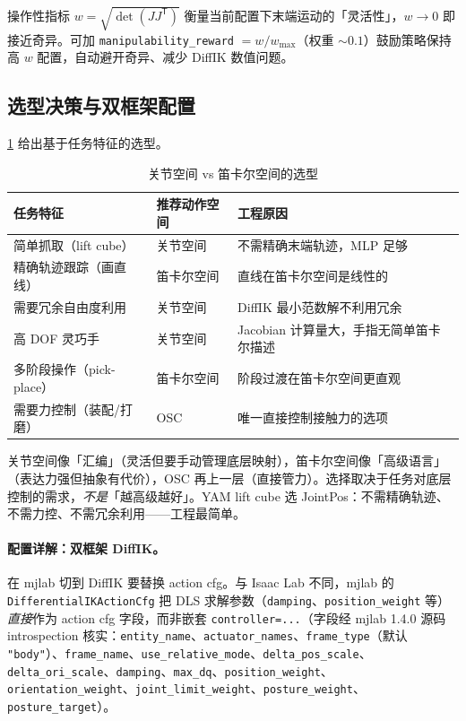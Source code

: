\begin{note}
操作性指标 $w=\sqrt{\det(JJ^{\mathsf T})}$ 衡量当前配置下末端运动的「灵活性」，$w\to 0$ 即接近奇异。可加 \verb|manipulability_reward| $=w/w_{\max}$（权重 $\sim 0.1$）鼓励策略保持高 $w$ 配置，自动避开奇异、减少 DiffIK 数值问题。
\end{note}

\subsection{选型决策与双框架配置}
\label{sec:rlmc-manip-actionchoose}

\cref{tab:rlmc-manip-actionchoose} 给出基于任务特征的选型。

\begin{table}[ht]
\centering
\small
\caption{关节空间 vs 笛卡尔空间的选型}
\label{tab:rlmc-manip-actionchoose}
\begin{tabular}{@{}lll@{}}
\toprule
任务特征 & 推荐动作空间 & 工程原因 \\
\midrule
简单抓取（lift cube） & 关节空间 & 不需精确末端轨迹，MLP 足够 \\
精确轨迹跟踪（画直线） & 笛卡尔空间 & 直线在笛卡尔空间是线性的 \\
需要冗余自由度利用 & 关节空间 & DiffIK 最小范数解不利用冗余 \\
高 DOF 灵巧手 & 关节空间 & Jacobian 计算量大，手指无简单笛卡尔描述 \\
多阶段操作（pick-place） & 笛卡尔空间 & 阶段过渡在笛卡尔空间更直观 \\
需要力控制（装配/打磨） & OSC & 唯一直接控制接触力的选项 \\
\bottomrule
\end{tabular}
\end{table}

\begin{insight}\label{ins:rlmc-manip-abstraction}
关节空间像「汇编」（灵活但要手动管理底层映射），笛卡尔空间像「高级语言」（表达力强但抽象有代价），OSC 再上一层（直接管力）。选择取决于任务对底层控制的需求，\emph{不是}「越高级越好」。YAM lift cube 选 JointPos：不需精确轨迹、不需力控、不需冗余利用——工程最简单。
\end{insight}

\paragraph{配置详解：双框架 DiffIK。}在 mjlab 切到 DiffIK 要替换 action cfg。与 Isaac Lab 不同，mjlab 的 \verb|DifferentialIKActionCfg| 把 DLS 求解参数（\verb|damping|、\verb|position_weight| 等）\emph{直接}作为 action cfg 字段，而非嵌套 \verb|controller=...|（字段经 mjlab 1.4.0 源码 introspection 核实：\verb|entity_name|、\verb|actuator_names|、\verb|frame_type|（默认 \texttt{"body"}）、\verb|frame_name|、\verb|use_relative_mode|、\verb|delta_pos_scale|、\verb|delta_ori_scale|、\verb|damping|、\verb|max_dq|、\verb|position_weight|、\verb|orientation_weight|、\verb|joint_limit_weight|、\verb|posture_weight|、\verb|posture_target|）。


